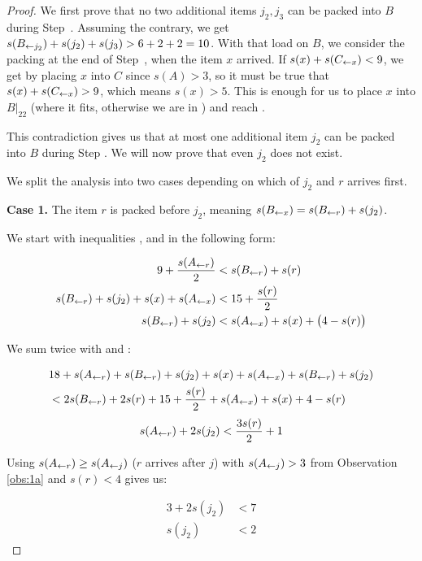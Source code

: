 \begin{proof}

We first prove that no two additional items $j_2, j_3$ can be packed into $B$
during Step~. Assuming the contrary, we get $s(B_{\leftarrow j_2}) +
s(j_2) + s(j_3) > 6 + 2 + 2 = 10$. With that load on $B$, we consider
the packing at the end of Step~, when the item $x$ arrived. If
$s(x) + s(C_{\leftarrow x}) < 9$, we get  by placing $x$ into $C$ since $s(A)>3$, so it must be true
that $s(x) + s(C_{\leftarrow x}) > 9$, which means $s(x) >
5$. This is enough for us to place $x$ into $B|_{22}$
(where it fits, otherwise we are in ) and reach .

This contradiction gives us that at most one additional item $j_2$ can
be packed into $B$ during Step . We will now prove that
even $j_2$ does not exist.

We split the analysis into two cases depending on which of $j_2$ and $r$ arrives first.

\smallskip
\noindent \textbf{Case 1.} The item $r$ is packed
before $j_2$, meaning $s(B_{\leftarrow x}) = s(B_{\leftarrow r}) + s(j_2)$.

We start with inequalities ,  and  in the following form:

\begin{align*}
9 + \frac{s(A_{\leftarrow r})}{2} &< s(B_{\leftarrow r}) + s(r) \\
s(B_{\leftarrow r}) + s(j_2) + s(x) + s(A_{\leftarrow x}) &< 15 + \frac{s(r)}{2} \\
s(B_{\leftarrow r}) + s(j_2) &< s(A_{\leftarrow x}) + s(x) + \big(4 - s(r)\big)
\end{align*}

We sum twice  with  and :

\begin{align*}
&18 + s(A_{\leftarrow r}) + s(B_{\leftarrow r}) + s(j_2) + s(x) + s(A_{\leftarrow x}) + s(B_{\leftarrow r}) + s(j_2) \\
&< 2s(B_{\leftarrow r}) + 2s(r) + 15 + \frac{s(r)}{2} + s(A_{\leftarrow x}) + s(x) + 4 - s(r)
\end{align*}
\[ s(A_{\leftarrow r}) + 2s(j_2) < \frac{3s(r)}{2} + 1\]

Using $s(A_{\leftarrow r}) \ge s(A_{\leftarrow j})$ ($r$ arrives after $j$)
with $s(A_{\leftarrow j}) > 3$ from Observation \ref{obs:1a} and $s(r) < 4$ gives us:

\begin{align*}
3 + 2s(j_2) &< 7 \\
s(j_2) &< 2
\end{align*}


\end{proof}
